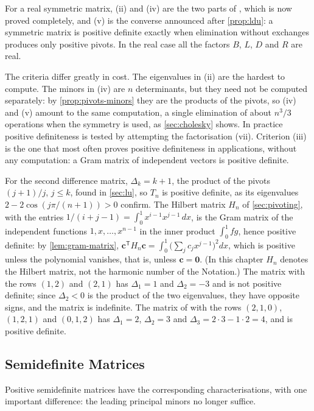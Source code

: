 For a real symmetric matrix, (ii) and (iv) are the two parts of , which is now proved completely, and (v) is the converse announced after \cref{prop:ldu}: a symmetric matrix is positive definite exactly when elimination without exchanges produces only positive pivots. In the real case all the factors $B$, $L$, $D$ and $R$ are real.

The criteria differ greatly in cost. The eigenvalues in (ii) are the hardest to compute. The minors in (iv) are $n$ determinants, but they need not be computed separately: by \cref{prop:pivots-minors} they are the products of the pivots, so (iv) and (v) amount to the same computation, a single elimination of about $n^3/3$ operations when the symmetry is used, as \cref{sec:cholesky} shows. In practice positive definiteness is tested by attempting the factorisation (vii). Criterion (iii) is the one that most often proves positive definiteness in applications, without any computation: a Gram matrix of independent vectors is positive definite.

For the second difference matrix, $\Delta_k=k+1$, the product of the pivots $(j+1)/j$, $j\le k$, found in \cref{sec:lu}, so $T_n$ is positive definite, as its eigenvalues $2-2\cos(j\pi/(n+1))>0$ confirm. The Hilbert matrix $H_n$ of \cref{sec:pivoting}, with the entries $1/(i+j-1)=\int_0^1x^{i-1}x^{j-1}\,dx$, is the Gram matrix of the independent functions $1,x,\ldots,x^{n-1}$ in the inner product $\int_0^1fg$, hence positive definite: by \cref{lem:gram-matrix}, $\mathbf c^{\mathsf T}H_n\mathbf c=\int_0^1\bigl(\sum_jc_jx^{j-1}\bigr)^2dx$, which is positive unless the polynomial vanishes, that is, unless $\mathbf c=\mathbf 0$. (In this chapter $H_n$ denotes the Hilbert matrix, not the harmonic number of the Notation.) The matrix with the rows $(1,2)$ and $(2,1)$ has $\Delta_1=1$ and $\Delta_2=-3$ and is not positive definite; since $\Delta_2<0$ is the product of the two eigenvalues, they have opposite signs, and the matrix is indefinite. The matrix of  with the rows $(2,1,0)$, $(1,2,1)$ and $(0,1,2)$ has $\Delta_1=2$, $\Delta_2=3$ and $\Delta_3=2\cdot3-1\cdot2=4$, and is positive definite.

\subsection{Semidefinite Matrices}

Positive semidefinite matrices have the corresponding characterisations, with one important difference: the leading principal minors no longer suffice.

